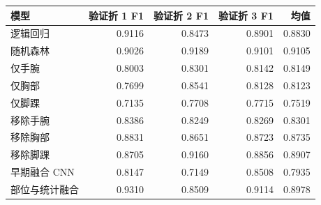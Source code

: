 \begin{tabular}{lrrrr}
\toprule
模型 & 验证折 1 F1 & 验证折 2 F1 & 验证折 3 F1 & 均值 \\
\midrule
逻辑回归 & 0.9116 & 0.8473 & 0.8901 & 0.8830 \\
随机森林 & 0.9026 & 0.9189 & 0.9101 & 0.9105 \\
仅手腕 & 0.8003 & 0.8301 & 0.8142 & 0.8149 \\
仅胸部 & 0.7699 & 0.8541 & 0.8128 & 0.8123 \\
仅脚踝 & 0.7135 & 0.7708 & 0.7715 & 0.7519 \\
移除手腕 & 0.8386 & 0.8249 & 0.8269 & 0.8301 \\
移除胸部 & 0.8831 & 0.8651 & 0.8723 & 0.8735 \\
移除脚踝 & 0.8705 & 0.9160 & 0.8856 & 0.8907 \\
早期融合 CNN & 0.8147 & 0.7149 & 0.8508 & 0.7935 \\
部位与统计融合 & 0.9310 & 0.8509 & 0.9114 & 0.8978 \\
\bottomrule
\end{tabular}
